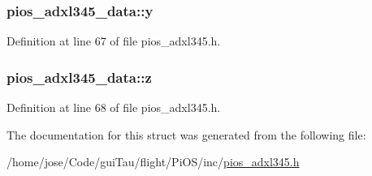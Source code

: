 \hypertarget{structpios__adxl345__data_a442839a6ffa895262a2a0924e6a5066a}{
\subsubsection[{y}]{ pios\-\_\-adxl345\-\_\-data\-::y}}\label{structpios__adxl345__data_a442839a6ffa895262a2a0924e6a5066a}


Definition at line 67 of file pios\-\_\-adxl345.\-h.

\hypertarget{structpios__adxl345__data_a5d428741b731802a2974ef2598fe1a4c}{
\subsubsection[{z}]{ pios\-\_\-adxl345\-\_\-data\-::z}}\label{structpios__adxl345__data_a5d428741b731802a2974ef2598fe1a4c}


Definition at line 68 of file pios\-\_\-adxl345.\-h.



The documentation for this struct was generated from the following file\-:\begin{DoxyCompactItemize}
\item 
/home/jose/\-Code/gui\-Tau/flight/\-Pi\-O\-S/inc/\hyperlink{pios__adxl345_8h}{pios\-\_\-adxl345.\-h}\end{DoxyCompactItemize}
